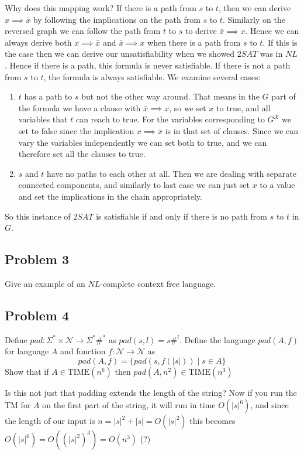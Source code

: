 \documentclass[english]{article}
\begin{document}
Why does this mapping work? 
If there is a path from $s$ to $t$, then we can derive $x \implies \bar{x}$ by following the implications on the path
from $s$ to $t$. Similarly on the reversed graph we can follow the path from $t$ to $s$ to derive
$\bar{x} \implies x$. Hence we can always derive both $x \implies \bar{x}$ and $\bar{x} \implies x$ when there is a
path from $s$ to $t$. If this is the case then we can derive our unsatisfiability when we showed $2SAT$ was in $NL$.
Hence if there is a path, this formula is never satisfiable. If there is not a path from $s$ to $t$, the formula is
always satisfiable. We examine several cases:
\begin{enumerate}
\item $t$ has a path to $s$ but not the other way around. That means in the $G$ part of the formula we have a clause
  with $\bar{x} \implies x$, so we set $x$ to true, and all variables that $t$ can reach to true. For the variables
  corresponding to $G^\mathcal{R}$ we set to false since the implication $x \implies \bar{x}$ is in that set of
  clauses. Since we can vary the variables independently we can set both to true, and we can therefore set all the 
  clauses to true. 
\item $s$ and $t$ have no paths to each other at all. Then we are dealing with separate connected components, and 
  similarly to last case we can just set $x$ to a value and set the implications in the chain appropriately. 
\end{enumerate}
So this instance of $2SAT$ is satisfiable if and only if there is no path from $s$ to $t$ in $G$. 

\subsection*{Problem 3}
Give an example of an $NL$-complete context free language.

\subsection*{Problem 4}
Define $pad : \Sigma^* \times \mathcal{N} \rightarrow \Sigma^*\#^*$ as $pad(s,l) = s\#^l$. Define
the language $pad(A,f)$ for language $A$ and function $f : \mathcal{N} \rightarrow \mathcal{N}$ as
\[ pad(A,f) = \{ pad(s,f(|s|)) \mid s \in A \} \]
Show that if $A \in \textrm{TIME}(n^6)$ then $pad(A,n^2) \in \textrm{TIME}(n^3)$

Is this not just that padding extends the length of the string? Now if you run the TM for $A$ on the 
first part of the string, it will run in time $O(|s|^6)$, and since the length of our input is
$n = |s|^2 + |s| = O(|s|^2)$ this becomes $O(|s|^6) = O((|s|^2)^3) = O(n^3)$ (?)
\end{document}
